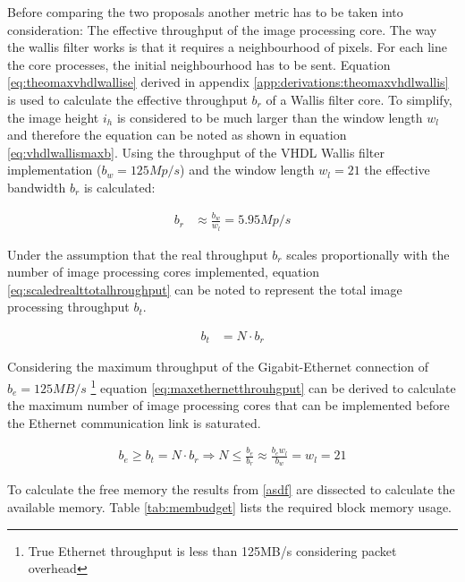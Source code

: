 Before comparing the two proposals another metric has to be taken into
consideration: The effective throughput of the image processing core. The way
the wallis filter works is that it requires a neighbourhood of pixels. For each
line the core processes, the initial neighbourhood has to be sent. Equation
\ref{eq:theomaxvhdlwallise} derived in appendix 
\ref{app:derivations:theomaxvhdlwallis} is used to calculate the effective
throughput $b_r$ of a Wallis filter core. To simplify, the image height $i_h$ is
considered to be much larger than the window length $w_l$ and therefore the
equation can be noted as shown in equation \ref{eq:vhdlwallismaxb}. Using the
throughput of the VHDL Wallis filter implementation ($b_w=125Mp/s$) and the
window length $w_l=21$ the effective bandwidth $b_r$ is calculated:

\begin{align}
    b_r  & \approx \frac{b_w}{w_l} = 5.95 Mp/s
    \label{eq:vhdlwallismaxb}
\end{align}

Under the assumption that the real throughput $b_r$ scales proportionally with the
number of image processing cores implemented, equation 
\ref{eq:scaledrealttotalhroughput} can be noted to represent the total image
processing throughput $b_t$.

\begin{align}
    b_t  & = N \cdot b_r
    \label{eq:scaledrealttotalhroughput}
\end{align}

Considering the maximum throughput of the Gigabit-Ethernet connection of
$b_e=125MB/s$ \footnote{True Ethernet throughput is less than 125MB/s
considering packet overhead} equation \ref{eq:maxethernetthrouhgput} can be derived to calculate the
maximum number of image processing cores that can be implemented before the
Ethernet communication link is saturated.

\begin{align}
    b_e \geq b_t = N \cdot b_r \Rightarrow N \leq \frac{b_e}{b_r} \approx 
    \frac{b_e w_l}{b_w} = w_l = 21
    \label{eq:maxethernetthrouhgput}
\end{align}

To calculate the free memory the results from \ref{asdf}  are dissected to calculate the available memory. Table \ref{tab:membudget}
lists the required block memory usage.

